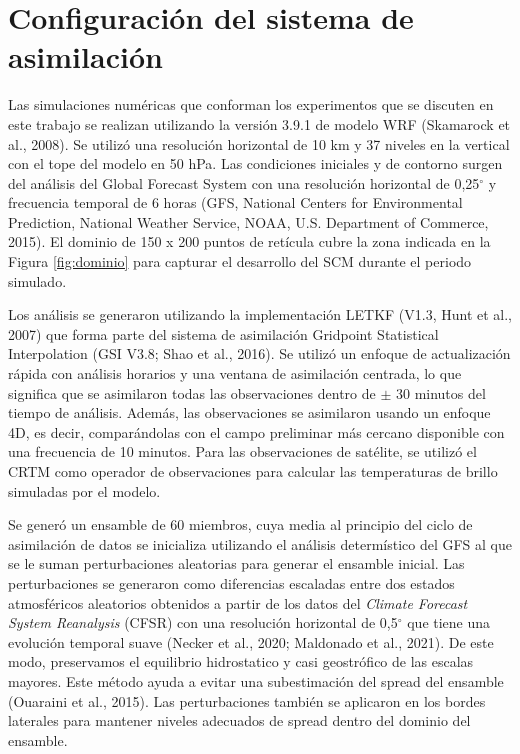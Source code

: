\documentclass[12pt,oneside,a4paper]{reedthesis}
\begin{document}
\hypertarget{configmodelo}{%
\section{Configuración del sistema de asimilación}\label{configmodelo}}

Las simulaciones numéricas que conforman los experimentos que se discuten en este trabajo se realizan utilizando la versión 3.9.1 de modelo WRF (Skamarock et al., 2008).
Se utilizó una resolución horizontal de 10 km y 37 niveles en la vertical con el tope del modelo en 50 hPa.
Las condiciones iniciales y de contorno surgen del análisis del Global Forecast System con una resolución horizontal de 0,25\(^{\circ}\) y frecuencia temporal de 6 horas (GFS, National Centers for Environmental Prediction, National Weather Service, NOAA, U.S. Department of Commerce, 2015).
El dominio de 150 x 200 puntos de retícula cubre la zona indicada en la Figura \ref{fig:dominio} para capturar el desarrollo del SCM durante el periodo simulado.

Los análisis se generaron utilizando la implementación LETKF (V1.3, Hunt et al., 2007) que forma parte del sistema de asimilación Gridpoint Statistical Interpolation (GSI V3.8; Shao et al., 2016).
Se utilizó un enfoque de actualización rápida con análisis horarios y una ventana de asimilación centrada, lo que significa que se asimilaron todas las observaciones dentro de \(\pm\) 30 minutos del tiempo de análisis.
Además, las observaciones se asimilaron usando un enfoque 4D, es decir, comparándolas con el campo preliminar más cercano disponible con una frecuencia de 10 minutos.
Para las observaciones de satélite, se utilizó el CRTM como operador de observaciones para calcular las temperaturas de brillo simuladas por el modelo.

Se generó un ensamble de 60 miembros, cuya media al principio del ciclo de asimilación de datos se inicializa utilizando el análisis determístico del GFS al que se le suman perturbaciones aleatorias para generar el ensamble inicial. Las perturbaciones se generaron como diferencias escaladas entre dos estados atmosféricos aleatorios obtenidos a partir de los datos del \emph{Climate Forecast System Reanalysis} (CFSR) con una resolución horizontal de 0,5\(^{\circ}\) que tiene una evolución temporal suave (Necker et al., 2020; Maldonado et al., 2021). De este modo, preservamos el equilibrio hidrostatico y casi geostrófico de las escalas mayores. Este método ayuda a evitar una subestimación del spread del ensamble (Ouaraini et al., 2015). Las perturbaciones también se aplicaron en los bordes laterales para mantener niveles adecuados de spread dentro del dominio del ensamble.
\end{document}
